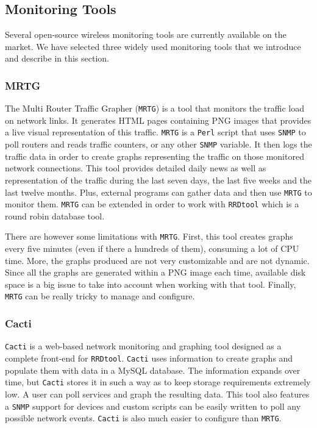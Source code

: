 \subsection{Monitoring Tools}
Several open-source wireless monitoring tools are currently available on the market. We have selected three widely used monitoring tools that we introduce and describe in this section.

\subsubsection{MRTG}
The Multi Router Traffic Grapher (\texttt{MRTG}) \cite{mrtg} is a tool that monitors the traffic load on network links. It generates HTML pages containing PNG images that provides a live visual representation of this traffic. \texttt{MRTG} is a \texttt{Perl} script that uses \texttt{SNMP} to poll routers and reads traffic counters, or any other \texttt{SNMP} variable. It then logs the traffic data in order to create graphs representing the traffic on those monitored network connections. This tool provides detailed daily news as well as representation of the traffic during the last seven days, the last five weeks and the last twelve months. Plus, external programs can gather data and then use \texttt{MRTG} to monitor them. \texttt{MRTG} can be extended in order to work with \texttt{RRDtool} \cite{rrdtool} which is a round robin database tool.

There are however some limitations with \texttt{MRTG}. First, this tool creates graphs every five minutes (even if there a hundreds of them), consuming a lot of CPU time. More, the graphs produced are not very customizable and are not dynamic. Since all the graphs are generated within a PNG image each time, available disk space is a big issue to take into account when working with that tool. Finally, \texttt{MRTG} can be really tricky to manage and configure.

\subsubsection{Cacti}
\texttt{Cacti} \cite{cacti} is a web-based network monitoring and graphing tool designed as a complete front-end for \texttt{RRDtool}. \texttt{Cacti} uses information to create graphs and populate them with data in a MySQL database. The information expands over time, but \texttt{Cacti} stores it in such a way as to keep storage requirements extremely low. A user can poll services and graph the resulting data. This tool also features a \texttt{SNMP} support for devices and custom scripts can be easily written to poll any possible network events. \texttt{Cacti} is also much easier to configure than \texttt{MRTG}.

